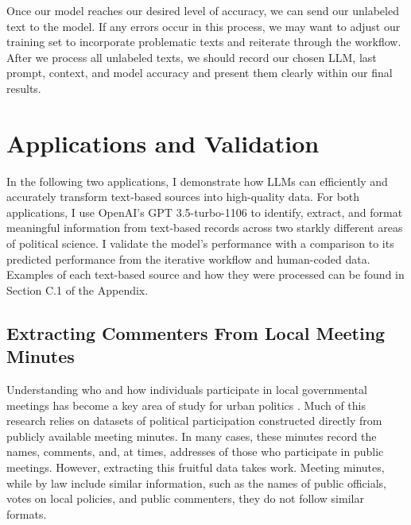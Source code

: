     Once our model reaches our desired level of accuracy, we can send our unlabeled text to the model. If any errors occur in this process, we may want to adjust our training set to incorporate problematic texts and reiterate through the workflow. After we process all unlabeled texts, we should record our chosen LLM, last prompt, context, and model accuracy and present them clearly within our final results.


    \section{Applications and Validation}

    In the following two applications, I demonstrate how LLMs can efficiently and accurately transform text-based sources into high-quality data. For both applications, I use OpenAI's GPT 3.5-turbo-1106 to identify, extract, and format meaningful information from text-based records across two starkly different areas of political science. I validate the model's performance with a comparison to its predicted performance from the iterative workflow and human-coded data. Examples of each text-based source and how they were processed can be found in Section C.1 of the Appendix.

    \subsection{Extracting Commenters From Local Meeting Minutes}
    Understanding who and how individuals participate in local governmental meetings has become a key area of study for urban politics \citep{einsteinWhoParticipatesLocal2019,einsteinStillMutedLimited2022,yoderDoesPropertyOwnership2020,nuamahCostParticipatingPoor2021,collinsDoesMeetingStyle2021}. Much of this research relies on datasets of political participation constructed directly from publicly available meeting minutes. In many cases, these minutes record the names, comments, and, at times, addresses of those who participate in public meetings. However, extracting this fruitful data takes work. Meeting minutes, while by law include similar information, such as the names of public officials, votes on local policies, and public commenters, they do not follow similar formats.

